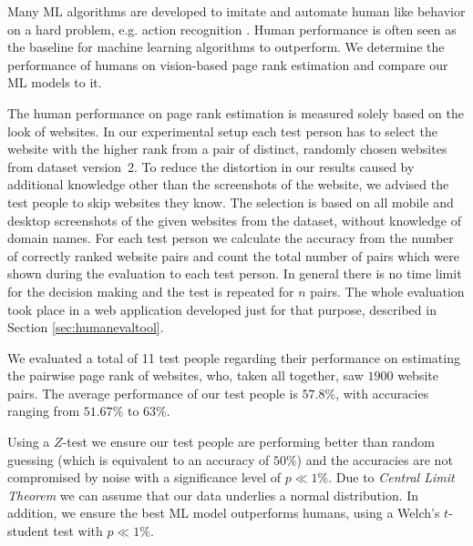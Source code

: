 Many ML algorithms are developed to imitate and automate human like behavior on a hard problem, e.g. action recognition \cite{gu2018ava}. Human performance is often seen as the baseline for machine learning algorithms to outperform. We determine the performance of humans on vision-based page rank estimation and compare our ML models to it. 

The human performance on page rank estimation is measured solely based on the look of websites. In our experimental setup each test person has to select the website with the higher rank from a pair of distinct, randomly chosen websites from dataset version~2. To reduce the distortion in our results caused by additional knowledge other than the screenshots of the website, we advised the test people to skip websites they know. The selection is based on all mobile and desktop screenshots of the given websites from the dataset, without knowledge of domain names.
For each test person we calculate the accuracy from the number of correctly ranked website pairs and count the total number of pairs which were shown during the evaluation to each test person. In general there is no time limit for the decision making and the test is repeated for $n$ pairs.
The whole evaluation took place in a web application developed just for that purpose, described in Section \ref{sec:humanevaltool}.

We evaluated a total of 11 test people regarding their performance on estimating the pairwise page rank of websites, who, taken all together, saw $1900$ website pairs. The average performance of our test people is $57.8\%$, with accuracies ranging from $51.67\%$ to $63\%$.

Using a $Z$-test we ensure our test people are performing better than random guessing (which is equivalent to an accuracy of $50\%$) and the accuracies are not compromised by noise with a significance level of $p \ll 1\%$. Due to \textit{Central Limit Theorem} we can assume that our data underlies a normal distribution. In addition, we ensure the best ML model outperforms humans, using a Welch's $t$-student test with $p \ll 1\%$.

